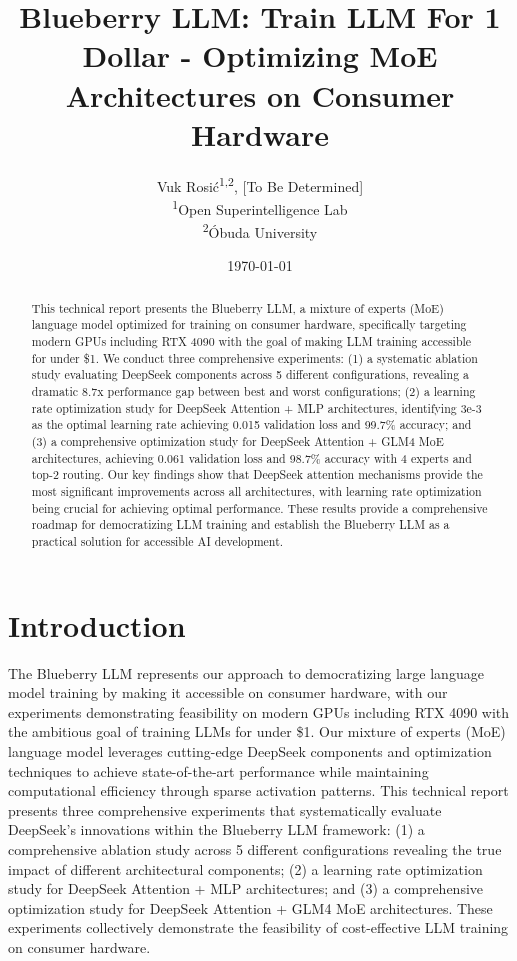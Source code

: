 \documentclass[11pt,a4paper]{article}
\title{Blueberry LLM: Train LLM For 1 Dollar - Optimizing MoE Architectures on Consumer Hardware}
\author{
    Vuk Rosić\textsuperscript{1,2}, [To Be Determined] \\
    \textsuperscript{1}Open Superintelligence Lab \\
    \textsuperscript{2}Óbuda University
}
\date{\today}
\begin{document}
\maketitle

\begin{abstract}
This technical report presents the Blueberry LLM, a mixture of experts (MoE) language model optimized for training on consumer hardware, specifically targeting modern GPUs including RTX 4090 with the goal of making LLM training accessible for under \$1. We conduct three comprehensive experiments: (1) a systematic ablation study evaluating DeepSeek components across 5 different configurations, revealing a dramatic 8.7x performance gap between best and worst configurations; (2) a learning rate optimization study for DeepSeek Attention + MLP architectures, identifying 3e-3 as the optimal learning rate achieving 0.015 validation loss and 99.7\% accuracy; and (3) a comprehensive optimization study for DeepSeek Attention + GLM4 MoE architectures, achieving 0.061 validation loss and 98.7\% accuracy with 4 experts and top-2 routing. Our key findings show that DeepSeek attention mechanisms provide the most significant improvements across all architectures, with learning rate optimization being crucial for achieving optimal performance. These results provide a comprehensive roadmap for democratizing LLM training and establish the Blueberry LLM as a practical solution for accessible AI development.
\end{abstract}

\section{Introduction}

The Blueberry LLM represents our approach to democratizing large language model training by making it accessible on consumer hardware, with our experiments demonstrating feasibility on modern GPUs including RTX 4090 with the ambitious goal of training LLMs for under \$1. Our mixture of experts (MoE) language model leverages cutting-edge DeepSeek components and optimization techniques to achieve state-of-the-art performance while maintaining computational efficiency through sparse activation patterns. This technical report presents three comprehensive experiments that systematically evaluate DeepSeek's innovations within the Blueberry LLM framework: (1) a comprehensive ablation study across 5 different configurations revealing the true impact of different architectural components; (2) a learning rate optimization study for DeepSeek Attention + MLP architectures; and (3) a comprehensive optimization study for DeepSeek Attention + GLM4 MoE architectures. These experiments collectively demonstrate the feasibility of cost-effective LLM training on consumer hardware.
\end{document}
